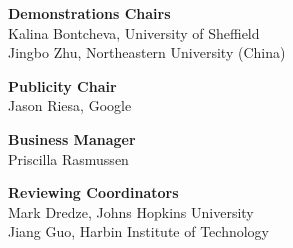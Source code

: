 {\bf Demonstrations Chairs} \\
Kalina Bontcheva, University of Sheffield \\
Jingbo Zhu, Northeastern University (China) \\

{\bf Publicity Chair} \\
Jason Riesa, Google \\

{\bf Business Manager} \\
Priscilla Rasmussen \\

{\bf Reviewing Coordinators} \\
Mark Dredze, Johns Hopkins University \\
Jiang Guo, Harbin Institute of Technology \\

